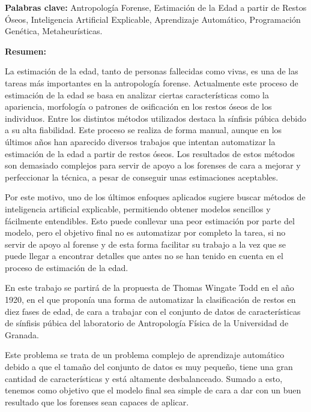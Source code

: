 \clearpage
\begin{center}
	{\large\textbf{\thetitle}}


	\theauthor
\end{center}

\textbf{Palabras clave:} Antropología Forense, Estimación de la Edad a partir de Restos Óseos, Inteligencia Artificial Explicable,
Aprendizaje Automático, Programación Genética, Metaheurísticas.

\textbf{Resumen:}

La estimación de la edad, tanto de personas fallecidas como vivas, es una de las tareas más importantes en la antropología forense. Actualmente este proceso de estimación de la edad se basa en analizar ciertas características como la apariencia, morfología o patrones de osificación en los restos óseos de los individuos. Entre los distintos métodos utilizados destaca la sínfisis púbica debido a su alta fiabilidad. Este proceso se realiza de forma manual, aunque en los últimos años han aparecido diversos trabajos que intentan automatizar la estimación de la edad a partir de restos óseos. Los resultados de estos métodos son demasiado complejos para servir de apoyo a los forenses de cara a mejorar y perfeccionar la técnica, a pesar de conseguir unas estimaciones aceptables.

Por este motivo, uno de los últimos enfoques aplicados sugiere buscar métodos de inteligencia artificial explicable, permitiendo obtener modelos sencillos y fácilmente entendibles. Esto puede conllevar una peor estimación por parte del modelo, pero el objetivo final no es automatizar por completo la tarea, si no servir de apoyo al forense y de esta forma facilitar su trabajo a la vez que se puede llegar a encontrar detalles que antes no se han tenido en cuenta en el proceso de estimación de la edad.

En este trabajo se partirá de la propuesta de Thomas Wingate Todd en el año 1920, en el que proponía una forma de automatizar la clasificación de restos en diez fases de edad, de cara a trabajar con el conjunto de datos de características de sínfisis púbica del laboratorio de Antropología Física de la Universidad de Granada.

Este problema se trata de un problema complejo de aprendizaje automático debido a que el tamaño del conjunto de datos es muy pequeño, tiene una gran cantidad de características y está altamente desbalanceado. Sumado a esto, tenemos como objetivo que el modelo final sea simple de cara a dar con un buen resultado que los forenses sean capaces de aplicar.

